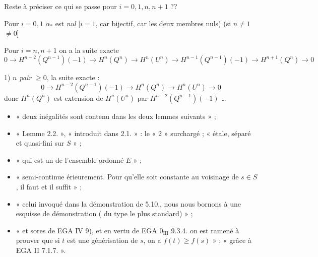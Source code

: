 \documentclass[11pt,a4paper]{article}
\begin{document}
Reste à préciser ce qui se passe pour $i = 0, 1, n, n+1$ ??

Pour $i = 0, 1$ \quad $\alpha_*$ est \emph{nul} [$i = 1$,  car
bijectif, car les deux membres nuls) (si $\boxed{n \neq 1}$ \ill{} \ill{}
$\neq 0$]

Pour $i = n, n+1$ on a la \struck{\ill{}} suite exacte
\[
  0 \to H^{n-2}(Q^{n-1})(-1) \to H^n(Q^n) \to H^n(U^n) \to
  H^{n-1}(Q^{n-1})(-1) \to H^{n+1}(Q^n) \to 0
\]

1) \emph{$n$ pair} $\geqslant 0$, la suite exacte \ill{} \ill{}  :
\[
  0 \to H^{n-2}(Q^{n-1})(-1) \to H^n(Q^n) \to H^n(U^n) \to 0
\]
donc $H^n(Q^n)$ est extension de $H^n(U^n)$ par $H^{n-2}(Q^{n-1})(-1)$ …



\begin{itemize}
  \item «   deux inégalités \struck{\ill{}} sont
  contenu dans les deux lemmes suivants » ;
  \item « Lemme 2.2. », « introduit dans 2.1. » : le « 2 » surchargé ;
  « étale,  séparé et quasi-fini sur $S$ » ;
  \item « qui est un   de l'ensemble ordonné $E$ » ;
  \item « semi-continue érieurement. Pour qu'elle soit constante au
  voisinage de $s \in S$, \struck{\ill{}} il faut et il suffit » ;
  \item « celui invoqué dans la démonstration de  5.10., nous nous
  bornons à une esquisse de  démonstration ( du type le
  plus standard) » ;
  \item « et sores de EGA IV 9), et en vertu de EGA $0_{\mathrm{III}}$
  9.3.4. on est ramené  à prouver que si $t$ est
  une générisation de $s$, on a $f(t) \geqslant f(s)$ » ; « \struck{\ill{}}
  grâce à EGA II 7.1.7. ».
\end{itemize}
\end{document}
